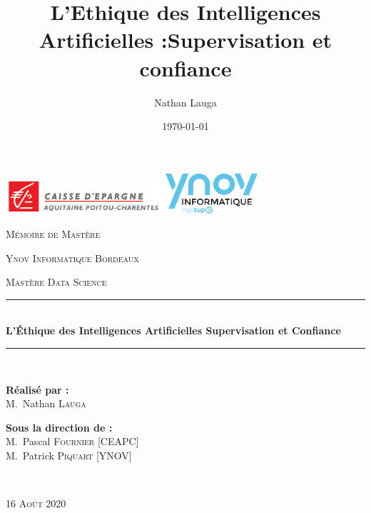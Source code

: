 \documentclass[10pt, french, a4paper]{report}
\title{L'Ethique des Intelligences Artificielles :\newline Supervisation et confiance}
\author{Nathan Lauga}
\date{\today}
\begin{document}

\begin{titlepage}
  \begin{center}

    \includegraphics[height=1.3cm]{images/CEAPC_logo.png}
    \hspace{\fill}
    \includegraphics[height=1.5cm]{images/ynov_informatique_logo.png}

    \vspace{2.5cm}
    {\scshape\LARGE Mémoire de Mastère\par}
    \vspace{1cm}
    {\scshape\Large Ynov Informatique Bordeaux\par}
    \vspace{0.5cm}
    {\scshape\large Mastère Data Science\par}
    \vspace{1cm}
    
    \rule{\linewidth}{0.3mm} \\[0.4cm]
    { \huge \bfseries L'\uppercase{é}thique des Intelligences Artificielles \newline Supervisation et Confiance \\[0.4cm] }
    \rule{\linewidth}{0.3mm} \\[1cm]
  
    \vspace{1.5cm}

    \noindent
    \begin{minipage}{0.4\textwidth}
      \begin{flushleft} \large
        \textbf{Réalisé par :}\\
        M.~Nathan \textsc{Lauga}\\
      \end{flushleft}
    \end{minipage}%
    \begin{minipage}{0.5\textwidth}
      \begin{flushright} \large
        \textbf{Sous la direction de :} \\
        M.~Pascal \textsc{Fournier} [CEAPC]\\
        M.~Patrick \textsc{Piquart} [YNOV]\\
      \end{flushright}
    \end{minipage}\\[1cm]

    \vspace{2.5cm}

    {\scshape\Large 16 Août 2020\par}
    
  \end{center}
\end{titlepage}
\end{document}
